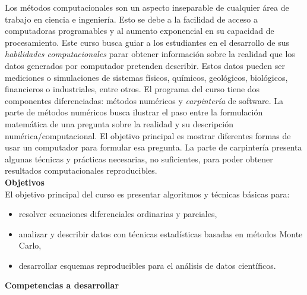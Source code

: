 \documentclass[letterpaper,10pt,onecolumn]{article}
\begin{document}
\noindent\normalsize Los m\'etodos computacionales son un aspecto
inseparable de cualquier \'area de trabajo en ciencia e ingenier\'ia.
Esto se debe a la facilidad de acceso a 
computadoras programables  y al aumento exponencial en su capacidad de
procesamiento. 
Este curso busca guiar a los estudiantes en el desarrollo de sus
\emph{habilidades computacionales} parar obtener informaci\'on sobre
la realidad que los datos generados por computador pretenden
describir.    
Estos datos pueden ser mediciones o simulaciones de
sistemas f\'isicos, qu\'imicos, geol\'ogicos, biol\'ogicos,
financieros o industriales, entre otros.     
El programa del curso tiene dos componentes diferenciadas: m\'etodos
num\'ericos  y \emph{carpinter\'ia} de software.  
La parte de m\'etodos num\'ericos busca ilustrar el paso entre la
formulaci\'on matem\'atica de una pregunta sobre la realidad y su
descripci\'on num\'erica/computacional.
El objetivo principal es mostrar diferentes formas de usar un
computador para formular esa pregunta.
La parte de carpinter\'ia presenta algunas t\'ecnicas y
pr\'acticas necesarias, no suficientes, para poder obtener resultados
computacionales reproducibles.     
\\[0.1cm] 

\noindent\textbf{\large {} \quad Objetivos}\\[-0.2cm]

\noindent\normalsize El objetivo principal del curso es presentar
algoritmos y t\'ecnicas b\'asicas para:

\begin{itemize}
\item resolver ecuaciones diferenciales ordinarias y parciales, \\[-0.6cm]
\item analizar y describir datos con t\'ecnicas estad\'isticas basadas
  en m\'etodos Monte Carlo, \\[-0.6cm]
\item desarrollar esquemas reproducibles para el an\'alisis de datos cient\'ificos. \\[-0.6cm]
\end{itemize} 
\vspace*{0.5cm} 

\noindent\textbf{\large {} \quad Competencias a
  desarrollar}\\[-0.2cm] 
\end{document}
